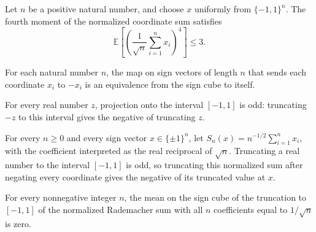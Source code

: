 \begin{theorem}
\label{FABL.normalizedRademacherSum_fourthMoment_le_three}
\leanok
{}
Let $n$ be a positive natural number, and choose $x$ uniformly from $\{-1,1\}^n$. The
fourth moment of the normalized coordinate sum satisfies
\[\mathbb E\left[\left(\frac{1}{\sqrt n}\sum_{i=1}^n x_i\right)^4\right]\le 3.\]
\end{theorem}

\begin{definition}
\label{FABL.negateSignCubeEquiv}
\leanok
For each natural number $n$, the map on sign vectors of length $n$ that sends each
coordinate $x_i$ to $-x_i$ is an equivalence from the sign cube to itself.
\end{definition}

\begin{theorem}
\label{FABL.truncateUnit_neg}
\leanok
{}
For every real number $z$, projection onto the interval $[-1,1]$ is odd: truncating $-z$
to this interval gives the negative of truncating $z$.
\end{theorem}

\begin{theorem}
\label{FABL.truncatedNormalizedRademacherSum_neg}
\leanok
{}
For every $n\ge 0$ and every sign vector $x\in\{\pm1\}^n$, let
$S_n(x)=n^{-1/2}\sum_{i=1}^n x_i$, with the coefficient interpreted as the real
reciprocal of $\sqrt n$. Truncating a real number to the interval $[-1,1]$ is odd, so
truncating this normalized sum after negating every coordinate gives the negative of its
truncated value at $x$.
\end{theorem}

\begin{theorem}
\label{FABL.mean_truncatedNormalizedRademacherSum}
\leanok
{}
For every nonnegative integer $n$, the mean on the sign cube of the truncation to
$[-1,1]$ of the normalized Rademacher sum with all $n$ coefficients equal to $1/\sqrt n$
is zero.
\end{theorem}

